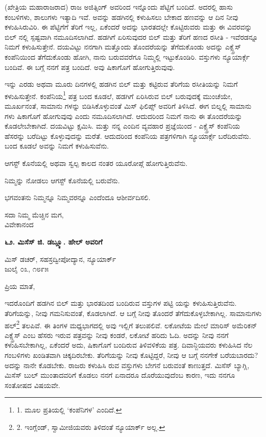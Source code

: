 (ಖೇತ್ರಿಯ ಮಹಾರಾಜರಾದ) ರಾಜ ಅಜಿತ್ಸಿಂಗ್ ಅವರಿಂದ ಇನ್ನೊಂದು ಪೆಟ್ಟಿಗೆ ಬಂದಿದೆ. ಅದರಲ್ಲಿ ಹಾಸು ಕಂಬಳಿಗಳು, ಶಾಲುಗಳು ಇತ್ಯಾದಿ ಇವೆ. ಅವನ್ನು ಹಡಗಿನಲ್ಲಿ ಕಳುಹಿಸಲು ಬೇಕಾದ ಹಣವನ್ನು ಆ ದಿನ ನೀವು ಕಳುಹಿಸಿರುವಿರಿ. ಈ ಪೆಟ್ಟಿಗೆಗೆ ತೆರಿಗೆ ಇಲ್ಲ, ಏಕೆಂದರೆ ಅದನ್ನು ಭಾರತದಲ್ಲೇ ಕೊಟ್ಟಿರುವರು ಮತ್ತು ಈ ವಿವರವನ್ನು ಬಿಲ್ ನಲ್ಲಿ ಸ್ಪಷ್ಟವಾಗಿ ನಮೂದಿಸಲಾಗಿದೆ. ಹಡಗಿಗೆ ಏರಿಸುವುದರ ಬಿಲ್ ಮತ್ತು ತೆರಿಗೆ ಹಣದ ರಸೀತಿ - ಇವೆರಡನ್ನೂ ನಿಮಗೆ ಕಳುಹಿಸುತ್ತೇನೆ. ದಯವಿಟ್ಟು ನನಗಾಗಿ ಮತ್ತೊಂದು ತೊಂದರೆಯನ್ನು ತೆಗೆದುಕೊಂಡು ಅದನ್ನು ಎಕ್ಸ್ಪ್ರೆಸ್ ಕಂಪೆನಿಯಿಂದ ತೆಗೆದುಕೊಂಡು ಹೋಗಿ, ನಾನು ಬರುವವರೆಗೂ ನಿಮ್ಮಲ್ಲಿ ಇಟ್ಟುಕೊಂಡಿರಿ. ವಸ್ತುಗಳು ನ್ಯೂಯಾರ್ಕ್ಗೆ ಬಂದಿವೆ. ಈ ಬಗ್ಗೆ ನನಗೆ ಪತ್ರ ಬಂದಿದೆ. ಅವು ಷಿಕಾಗೊಗೆ ಹೋಗುತ್ತಿರುವುವು.

ಇನ್ನು ಎರಡು ಅಥವಾ ಮೂರು ದಿನಗಳಲ್ಲಿ ಹಡಗಿನ ಬಿಲ್ ಮತ್ತು ಕಟ್ಟಿರುವ ತೆರಿಗೆಯ ರಸೀತಿಯನ್ನು ನಿಮಗೆ ಕಳುಹಿಸುತ್ತೇನೆ. ಕಂಪೆನಿಯ\footnote{1. ಮೂಲ ಪ್ರತಿಯಲ್ಲಿ ‘ಕಂಪೆನಿಗಳ’ ಎಂದಿದೆ.} ಪತ್ರ ಬಂದ ಕೂಡಲೆ, ಹಡಗಿಗೆ ಏರಿಸಿರುವ ಬಿಲ್ ಬರುವುದಕ್ಕೆ ಮುಂಚೆಯೇ, ಮೂರ್ಖನಂತೆ, ಸಾಮಾನು ಗಳನ್ನು ಬಿಡಿಸಿಕೊಳ್ಳುವಂತೆ ಮಿಸ್ ಫಿಲಿಪ್ಸ್ ಅವರಿಗೆ ತಿಳಿಸಿದೆ. ಈಗ ಬಿಲ್ನಲ್ಲಿ ಸಾಮಾನು ಗಳು ಷಿಕಾಗೊಗೆ ಹೋಗುವುವು ಎಂದು ನಮೂದಿಸಲಾಗಿದೆ. ಆದುದರಿಂದ ನಿಮಗೆ ನಾನು ಈ ತೊಂದರೆಯನ್ನು ಕೊಡಲೇಬೇಕಾಗಿದೆ. ದಯವಿಟ್ಟು ಕ್ಷಮಿಸಿ. ಮತ್ತು ನನ್ನ ಎಂದಿನ ವ್ಯವಹಾರ ಪ್ರಜ್ಞೆಯಿಂದ - ಎಕ್ಸ್ಪ್ರೆಸ್ ಕಂಪೆನಿಯ ಹೆಸರನ್ನು ಬರೆದಿಟ್ಟು ಕೊಳ್ಳುವುದನ್ನು ಮರೆತೆ. ಆದುದರಿಂದ ಕಂಪೆನಿಯ ಪತ್ರಗಳಿಗಾಗಿ ನ್ಯೂಯಾರ್ಕ್ಗೆ ಬರೆದಿರುವೆನು. ಬಂದ ಕೂಡಲೆ ಅವನ್ನು ನಿಮಗೆ ಕಳುಹಿಸುವೆನು.

ಆಗಸ್ಟ್ ಕೊನೆಯಲ್ಲಿ ಅಥವಾ ಸ್ವಲ್ಪ ಕಾಲದ ನಂತರ ಯೂರೋಪ್ಗೆ ಹೋಗುತ್ತಿರುವೆನು.

ನಿಮ್ಮನ್ನು ನೋಡಲು ಆಗಸ್ಟ್ ಕೊನೆಯಲ್ಲಿ ಬರುವೆನು.

ಭಗವಂತನು ನಿಮ್ಮನ್ನೂ ನಿಮ್ಮವರನ್ನೂ ಎಂದೆಂದೂ ಆಶೀರ್ವದಿಸಲಿ.

\begin{flushright}
ಸದಾ ನಿಮ್ಮ ಮೆಚ್ಚಿನ ಮಗ,\\ವಿವೇಕಾನಂದ
\end{flushright}

\begin{center}
\textbf{೬೨. ಮಿಸೆಸ್ ಜಿ. ಡಬ್ಲ್ಯೂ. ಹೇಲ್ ಅವರಿಗೆ}
\end{center}

\begin{flushright}
 ಮಿಸ್ ಡಚರ್, ಸಹಸ್ರದ್ವೀಪೋದ್ಯಾನ, ನ್ಯೂಯಾರ್ಕ್\\ಜುಲೈ ೦೩, ೧೮೯೫
\end{flushright}

ಪ್ರಿಯ ಮಾತೆ,

ಇದರೊಂದಿಗೆ ಹಡಗಿನ ಬಿಲ್ ಮತ್ತು ಭಾರತದಿಂದ ಬಂದಿರುವ ವಸ್ತುಗಳ ಪಟ್ಟಿ ಯನ್ನು ಕಳುಹಿಸುತ್ತಿರುವೆನು. ತೆರಿಗೆಯನ್ನು, ನೀವು ಗಮನಿಸುವಂತೆ, ಕೊಡಲಾಗಿದೆ. ಆ ಬಗ್ಗೆ ನೀವು ತೊಂದರೆ ತೆಗೆದುಕೊಳ್ಳಬೇಕಾಗಿಲ್ಲ. ಸಾಮಾನುಗಳು ಹಲ್\footnote{2. ಇಂಗ್ಲೆಂಡ್, ಸ್ವಾಮೀಜಿಯವರು ತಿಳಿದಂತೆ ನ್ಯೂಯಾರ್ಕ್ ಅಲ್ಲ.} ತಲಪಿವೆ. ಈ ತಿಂಗಳ ಮಧ್ಯಭಾಗದಲ್ಲಿ ಅವು ಇಲ್ಲಿಗೆ ತಲುಪಲಿವೆ. ಲಕೋಟೆಯ ಮೇಲೆ ಮಾರಿಸ್ ಅಮೆರಿಕನ್ ಎಕ್ಸ್ಪ್ರೆಸ್ ಎಂಬ ಹೆಸರು ಇರುವ ಪತ್ರವನ್ನು ನೀವು ಕಂಡರೆ, ಲಕೋಟೆ ಹರಿದು ಓದಿ. ಅದನ್ನು ನೀವು ನನಗೆ ಕಳುಹಿಸಬೇಕಾಗಿಲ್ಲ, ಏಕೆಂದರೆ ಅದು, ಷಿಕಾಗೊಗೆ ಬಂದಿರುವ ತಿಳಿವಳಿಕೆಯ ಪತ್ರ. ದಿವಾನ್ಜಿಯವರು ಕಳುಹಿಸಿದ ನೆಲ ಗಂಬಳಿಗಳು ಖಂಡಿತವಾಗಿ ಚಿಕ್ಕದಿರಬೇಕು. ತೆರಿಗೆಯನ್ನು ನೀವು ಕೊಟ್ಟಿದ್ದರೆ, ನೀವು ಆ ಬಗ್ಗೆ ನನಗೇಕೆ ಬರೆಯಬಾರದು? ಅದನ್ನು ನಾನೇ ಕೊಡಬೇಕು. ರಾಜರು ಕಳುಹಿಸಿ ರುವ ವಸ್ತುಗಳು ಬೇಗನೆ ಬರುವಂತೆ ಕಾಣುತ್ತದೆ. ಮಿಸೆಸ್ ಬ್ಯಾಗ್ಲಿ, ಮಿಸೆಸ್ ಬುಲ್ ಮುಂತಾದವರಿಗೆ ಕೊಡಲು ನನಗೆ ಏನಾದರೂ ದೊರೆಯುವುದೆಂಬ ಕಾರಣ, ಇದು ನನಗೂ ಸಂತೋಷದ ವಿಷಯವೇ.

